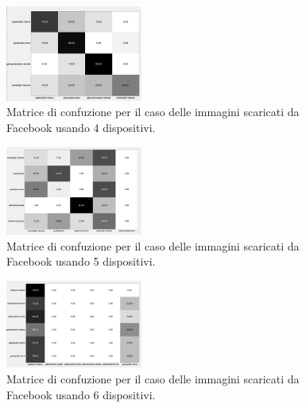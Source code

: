 \begin{figure}[h]
\begin{center}
\includegraphics[width=0.4\textwidth]{images/confusionmatrix_fb_4.png}
\end{center}
  \caption{Matrice di confuzione per il caso delle immagini scaricati da Facebook usando 4 dispositivi.}
\label{fig:validation}
\end{figure}

\begin{figure}[h]
\begin{center}
\includegraphics[width=0.4\textwidth]{images/confusionmatrix_fb_5.png}
\end{center}
  \caption{Matrice di confuzione per il caso delle immagini scaricati da Facebook usando 5 dispositivi.}
\label{fig:validation}
\end{figure}

\begin{figure}[h]
\begin{center}
\includegraphics[width=0.4\textwidth]{images/confusionmatrix_fb_6.png}
\end{center}
  \caption{Matrice di confuzione per il caso delle immagini scaricati da Facebook usando 6 dispositivi.}
\label{fig:validation}
\end{figure}

